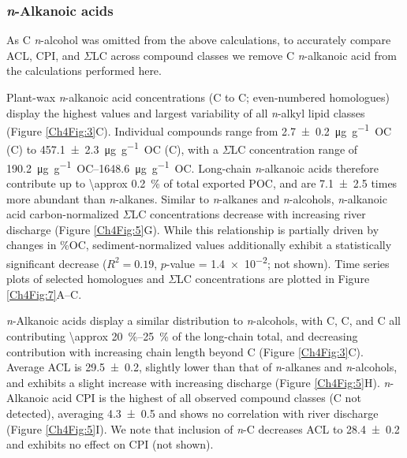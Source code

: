 \subsubsection{\textit{n}-Alkanoic acids}

As C \textit{n}-alcohol was omitted from the above calculations, to accurately compare ACL, CPI, and $\Sigma$LC across compound classes we remove C \textit{n}-alkanoic acid from the calculations performed here.

Plant-wax \textit{n}-alkanoic acid concentrations (C to C; even-numbered homologues) display the highest values and largest variability of all \textit{n}-alkyl lipid classes (Figure \ref{Ch4Fig:3}C). Individual compounds range from \SI{2.7 \pm 0.2}{\micro g.g^{-1}.OC} (C) to \SI{457.1 \pm 2.3}{\micro g.g^{-1}.OC} (C), with a $\Sigma$LC concentration range of \SIrange{190.2}{1648.6}{\micro g.g^{-1}.OC}. Long-chain \textit{n}-alkanoic acids therefore contribute up to \SI{\approx 0.2}{\%} of total exported POC, and are \num{7.1 \pm 2.5} times more abundant than \textit{n}-alkanes. Similar to \textit{n}-alkanes and \textit{n}-alcohols, \textit{n}-alkanoic acid carbon-normalized $\Sigma$LC concentrations decrease with increasing river discharge (Figure \ref{Ch4Fig:5}G). While this relationship is partially driven by changes in \%OC, sediment-normalized values additionally exhibit a statistically significant decrease ($R^2 = 0.19$, $p$-value = \num{1.4e-2}; not shown). Time series plots of selected homologues and $\Sigma$LC concentrations are plotted in Figure \ref{Ch4Fig:7}A--C.

\textit{n}-Alkanoic acids display a similar distribution to \textit{n}-alcohols, with C, C, and C all contributing \SIrange{\approx 20}{25}{\%} of the long-chain total, and decreasing contribution with increasing chain length beyond C (Figure \ref{Ch4Fig:3}C). Average ACL is \num{29.5 \pm 0.2}, slightly lower than that of \textit{n}-alkanes and \textit{n}-alcohols, and exhibits a slight increase with increasing discharge (Figure \ref{Ch4Fig:5}H). \textit{n}-Alkanoic acid CPI is the highest of all observed compound classes (C not detected), averaging \num{4.3 \pm 0.5} and shows no correlation with river discharge (Figure \ref{Ch4Fig:5}I). We note that inclusion of \textit{n}-C decreases ACL to \num{28.4 \pm 0.2} and exhibits no effect on CPI (not shown).

